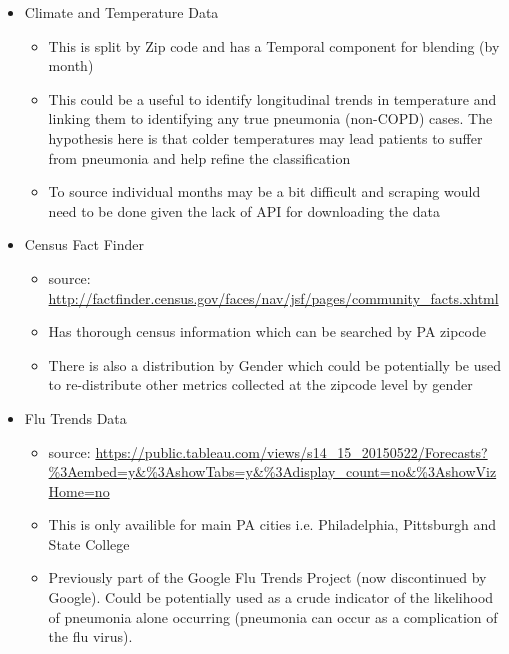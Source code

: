 \documentclass{article}
\begin{document}
\begin{itemize}
  \item Climate and Temperature Data
  \begin{itemize}
    \item This is split by Zip code and has a Temporal component for blending (by month)
    \item This could be a useful to identify longitudinal trends in temperature
          and linking them to identifying any true pneumonia (non-COPD) cases. The 
          hypothesis here is that colder temperatures may lead patients to 
          suffer from pneumonia and help refine the classification
    \item To source individual months may be a bit difficult and scraping 
          would need to be done given the lack of API for downloading the data
  \end{itemize}
  \item Census Fact Finder
  \begin{itemize}
    \item source: \url{http://factfinder.census.gov/faces/nav/jsf/pages/community_facts.xhtml}
    \item Has thorough census information which can be searched by PA zipcode
    \item There is also a distribution by Gender which could be potentially be 
          used to re-distribute other metrics collected at the zipcode level by 
          gender
  \end{itemize}
  \item Flu Trends Data
  \begin{itemize}
    \item source: \url{https://public.tableau.com/views/s14_15_20150522/Forecasts?%3Aembed=y&%3AshowTabs=y&%3Adisplay_count=no&%3AshowVizHome=no}
    \item This is only availible for main PA cities i.e. Philadelphia, 
          Pittsburgh and State College
    \item Previously part of the Google Flu Trends Project (now discontinued by 
          Google). Could be potentially used as a crude indicator of the 
          likelihood of pneumonia alone occurring (pneumonia can occur as 
          a complication of the flu virus).
  \end{itemize}
\end{itemize}
\end{document}
